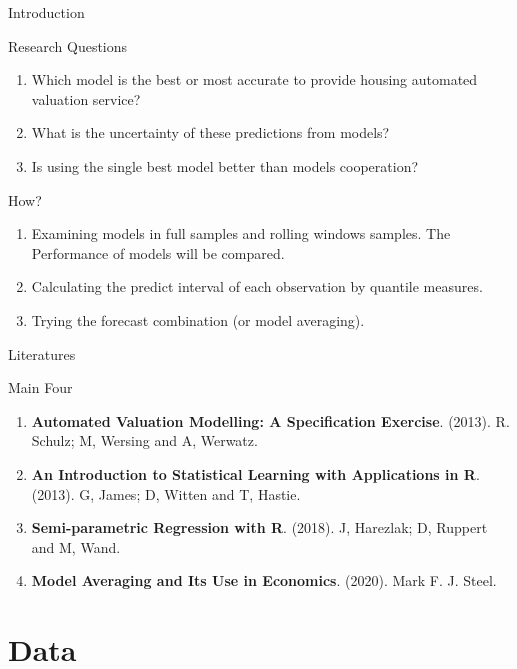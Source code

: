 \documentclass{beamer}
\begin{document}
\begin{frame}[t]{Introduction}

\begin{block}{Research Questions}
\begin{enumerate}
\item Which model is the best or most accurate to provide housing automated valuation service?
\item What is the uncertainty of these predictions from models?
\item Is using the single best model better than models cooperation?
\end{enumerate}
\end{block}

\begin{block}{How?}
\begin{enumerate}
\item Examining models in full samples and rolling windows samples. The Performance of models will be compared.
\item Calculating the predict interval of each observation by quantile measures.
\item Trying the forecast combination (or model averaging).
\end{enumerate}
\end{block}

\end{frame}

\begin{frame}[t]{Literatures}

\begin{block}{Main Four}
\begin{enumerate}
\item \textbf{Automated Valuation Modelling: A Specification Exercise}. (2013). R. Schulz; M, Wersing and A, Werwatz.
\item \textbf{An Introduction to Statistical Learning with Applications in R}. (2013). G, James; D, Witten and T, Hastie.
\item \textbf{Semi-parametric Regression with R}. (2018). J, Harezlak; D, Ruppert and M, Wand. 
\item \textbf{Model Averaging and Its Use in Economics}. (2020). Mark F. J. Steel. 
\end{enumerate}
\end{block}

\end{frame}

\section{Data}
\end{document}

